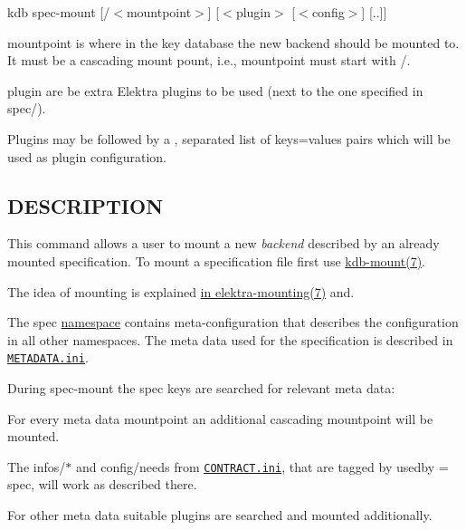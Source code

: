 {\ttfamily kdb spec-\/mount \mbox{[}/$<$mountpoint$>$\mbox{]} \mbox{[}$<$plugin$>$ \mbox{[}$<$config$>$\mbox{]} \mbox{[}..\mbox{]}\mbox{]}}


\begin{DoxyItemize}
\item {\ttfamily mountpoint} is where in the key database the new backend should be mounted to. It must be a cascading mount pount, i.\+e., {\ttfamily mountpoint} must start with {\ttfamily /}.
\item {\ttfamily plugin} are be extra Elektra plugins to be used (next to the one specified in {\ttfamily spec/}).
\item Plugins may be followed by a {\ttfamily ,} separated list of {\ttfamily keys=values} pairs which will be used as plugin configuration.
\end{DoxyItemize}

\subsection*{D\+E\+S\+C\+R\+I\+P\+T\+I\+O\+N}

This command allows a user to mount a new {\itshape backend} described by an already mounted specification. To mount a specification file first use \hyperlink{md_doc_help_kdb-mount_doc_help_kdb-mount_md}{kdb-\/mount(7)}.

The idea of mounting is explained \hyperlink{md_doc_help_elektra-mounting_doc_help_elektra-mounting_md}{in elektra-\/mounting(7)} and.

The {\ttfamily spec} \hyperlink{md_doc_help_elektra-namespaces_doc_help_elektra-namespaces_md}{namespace} contains meta-\/configuration that describes the configuration in all other namespaces. The meta data used for the specification is described in \href{/home/markus/Projekte/Elektra/current/doc/METADATA.ini}{\tt M\+E\+T\+A\+D\+A\+T\+A.\+ini}.

During {\ttfamily spec-\/mount} the {\ttfamily spec} keys are searched for relevant meta data\+:


\begin{DoxyItemize}
\item For every meta data {\ttfamily mountpoint} an additional cascading mountpoint will be mounted.
\item The {\ttfamily infos/$\ast$} and {\ttfamily config/needs} from \href{/home/markus/Projekte/Elektra/current/doc/CONTRACT.ini}{\tt C\+O\+N\+T\+R\+A\+C\+T.\+ini}, that are tagged by {\ttfamily usedby = spec}, will work as described there.
\item For other meta data suitable plugins are searched and mounted additionally.
\end{DoxyItemize}

